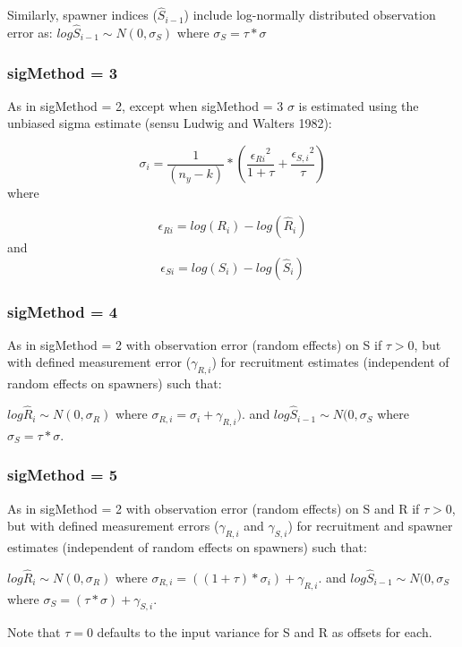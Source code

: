\documentclass[
]{article}
\begin{document}
Similarly, spawner indices (\(\hat{S}_{i-1}\)) include log-normally
distributed observation error as:
\(log\hat{S}_{i-1} \sim N(0,\sigma_S)\) where \(\sigma_S=\tau*\sigma\)

\hypertarget{sigmethod-3}{%
\subsubsection{sigMethod = 3}\label{sigmethod-3}}

As in sigMethod = 2, except when sigMethod = 3 \(\sigma\) is estimated
using the unbiased sigma estimate (sensu Ludwig and Walters 1982):

\[\sigma_i =  \frac1{(n_y-k)}*({ \frac{{\epsilon_{Ri}}^2}{1+\tau} + \frac{{\epsilon_{S,i}}^2}{\tau} })\]
where

\[\epsilon_{Ri} = log(R_i) - log(\hat R_i) \] and
\[\epsilon_{Si} = log(S_i) - log(\hat S_i) \]

\hypertarget{sigmethod-4}{%
\subsubsection{sigMethod = 4}\label{sigmethod-4}}

As in sigMethod = 2 with observation error (random effects) on S if
\(\tau >0\), but with defined measurement error (\(\gamma_{R,i}\)) for
recruitment estimates (independent of random effects on spawners) such
that:

\(log\hat{R}_i\sim N(0,\sigma_R)\) where
\(\sigma_{R,i}=\sigma_i+\gamma_{R,i})\). and
\(log\hat{S}_{i-1} \sim N(0,\sigma_S\) where \(\sigma_S=\tau*\sigma\).

\hypertarget{sigmethod-5}{%
\subsubsection{sigMethod = 5}\label{sigmethod-5}}

As in sigMethod = 2 with observation error (random effects) on S and R
if \(\tau >0\), but with defined measurement errors (\(\gamma_{R,i}\)
and \(\gamma_{S,i}\)) for recruitment and spawner estimates (independent
of random effects on spawners) such that:

\(log\hat{R}_i\sim N(0,\sigma_R)\) where
\(\sigma_{R,i}=((1+\tau)*\sigma_i)+\gamma_{R,i}\). and
\(log\hat{S}_{i-1} \sim N(0,\sigma_S\) where
\(\sigma_S=(\tau*\sigma)+\gamma_{S,i}\).

Note that \(\tau = 0\) defaults to the input variance for S and R as
offsets for each.
\end{document}
